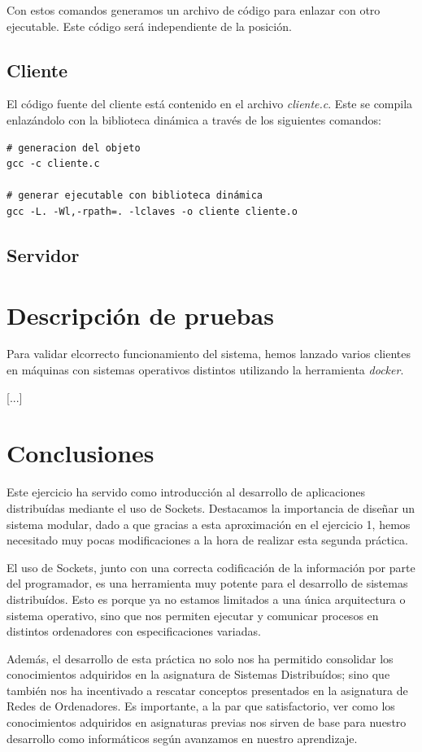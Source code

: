 \documentclass[]{article}
\begin{document}
Con estos comandos generamos un archivo de código  para enlazar con otro ejecutable. Este código será independiente de la posición. 

\subsection{Cliente}
\label{subsec:cliente}
El código fuente del cliente está contenido en el archivo \textit{cliente.c}. Este se compila enlazándolo con la biblioteca dinámica a través de los siguientes comandos: 

\begin{center}
\begin{lstlisting}[caption=Compiación de biblioteca dinámica]
# generacion del objeto
gcc -c cliente.c

# generar ejecutable con biblioteca dinámica
gcc -L. -Wl,-rpath=. -lclaves -o cliente cliente.o
\end{lstlisting}
\end{center}

\subsection{Servidor}
\label{subsec:servidor}


\section{Descripción de pruebas}
\label{sec:descripcion_de_pruebas}
Para validar elcorrecto funcionamiento del sistema, hemos lanzado varios clientes en máquinas con sistemas operativos distintos utilizando la herramienta \textit{docker}.

[...]

\section{Conclusiones}
\label{sec:conclusiones}
Este ejercicio ha servido como introducción al desarrollo de aplicaciones distribuídas mediante el uso de Sockets. Destacamos la importancia de diseñar un sistema modular, dado a que gracias a esta aproximación en el ejercicio 1, hemos necesitado muy pocas modificaciones a la hora de realizar esta segunda práctica. 

El uso de Sockets, junto con una correcta codificación de la información por parte del programador, es una herramienta muy potente para el desarrollo de sistemas distribuídos. Esto es porque ya no estamos limitados a una única arquitectura o sistema operativo, sino que nos permiten ejecutar y comunicar procesos en distintos ordenadores con especificaciones variadas. 

Además, el desarrollo de esta práctica no solo nos ha permitido consolidar los conocimientos adquiridos en la asignatura de Sistemas Distribuídos; sino que también nos ha incentivado a rescatar conceptos presentados en la asignatura de Redes de Ordenadores. Es importante, a la par que satisfactorio, ver como los conocimientos adquiridos en asignaturas previas nos sirven de base para nuestro desarrollo como informáticos según avanzamos en nuestro aprendizaje. 
\end{document}
